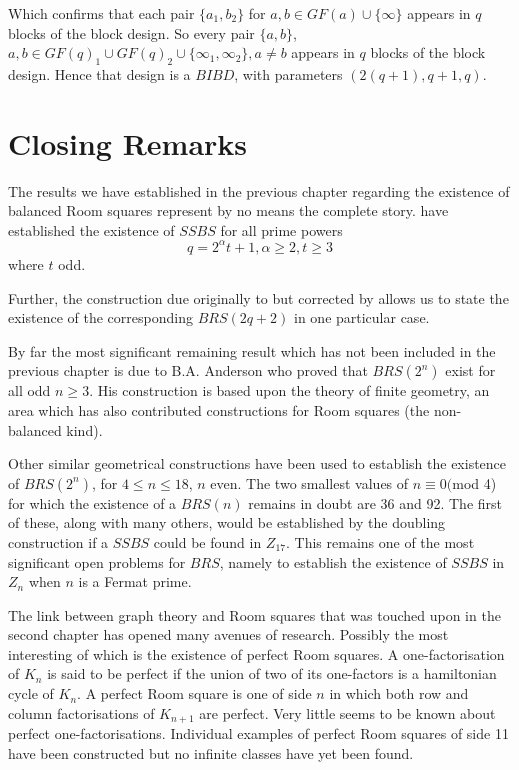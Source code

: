 \documentclass[11pt, a4paper]{book}\usepackage[]{graphicx}\usepackage[]{xcolor}
\newcounter{example}
\begin{document}
Which confirms that each pair $\{a_1, b_2\}$ for
$a, b \in GF(a) \cup \{\infty\}$ appears in $q$ blocks
of the block design.  So every pair $\{a, b\}$,
$a, b \in GF(q)_1 \cup GF(q)_2 \cup \{\infty _1, \infty _2\}, a \neq b$
appears in $q$ blocks of the block design. Hence that design
is a $BIBD$, with parameters $(2(q + 1), q + 1, q)$.
        

\chapter{Closing Remarks}

The results we have established in the previous chapter regarding the
existence of balanced Room squares represent by no means the complete
story.
\cite{duExistenceSymmetricSkew1988}
have established the existence of $SSBS$ for
all prime powers
\begin{equation}
q = 2^{\alpha}t + 1, \alpha \geq 2, t \geq 3
\end{equation}
where $t$ odd.

Further, the construction due
originally to
\cite{hwangCompleteBalancedHowell1984}
but corrected by
\cite{andersonConstructionBalancedRoom1999}
allows us to
state the existence of the corresponding $BRS(2q + 2)$ in one particular
case.

By far the most significant remaining result which has not been included
in the previous chapter is due to B.A. Anderson who proved that
$BRS(2^n)$ exist for all odd $n \geq 3$. His construction is based upon
the theory of finite geometry, an area which has also contributed
constructions for Room squares (the non-balanced kind).

Other similar
geometrical constructions have been used to establish the existence of
$BRS(2^n)$, for $4 \leq n \leq 18$, $n$ even. The two smallest values of
$n \equiv 0($mod 4) for which the existence of a $BRS(n)$ remains in
doubt are 36 and 92. The first of these, along with many others, would
be established by the doubling construction if a $SSBS$ could be found
in $Z_{17}$. This remains one of the most significant open problems for
$BRS$, namely to establish the existence of $SSBS$ in $Z_n$ when $n$ is
a Fermat prime.

The link between graph theory and Room squares that was touched upon in
the second chapter has opened many avenues of research. Possibly the
most interesting of which is the existence of perfect Room squares. A
one-factorisation of $K_n$ is said to be perfect if the union of two of
its one-factors is a hamiltonian cycle of $K_n$. A perfect Room square
is one of side $n$ in which both row and column factorisations of
$K_{n + 1}$ are perfect. Very little seems to be known about perfect
one-factorisations. Individual examples of perfect Room squares of side
11 have been constructed but no infinite classes have yet been found.

\backmatter
\printbibliography[title=References]
\end{document}
